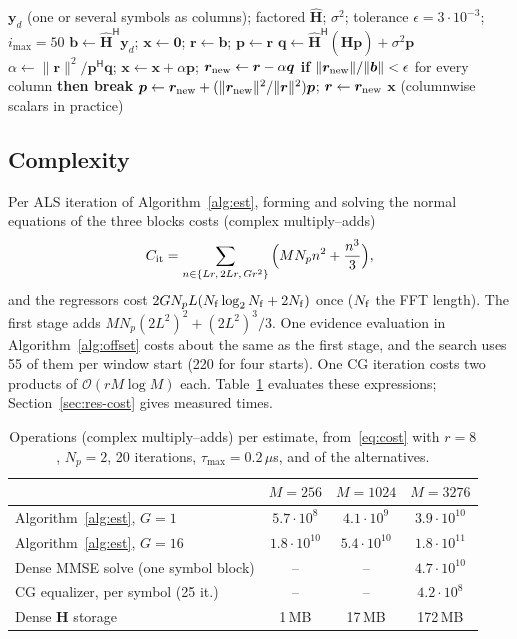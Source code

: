 \begin{algorithm}[!htbp]
\caption{Matrix-free CG-MMSE equalization}\label{alg:cg}
\begin{algorithmic}[1]
\Require $\bm y_d$ (one or several symbols as columns); factored $\hat{\bm H}$; $\sigma^2$; tolerance $\epsilon=3\cdot10^{-3}$; $i_{\max}=50$
\State $\bm b\gets\hat{\bm H}^{\mathsf H}\bm y_d$; $\bm x\gets\bm 0$; $\bm r\gets\bm b$; $\bm p\gets\bm r$
  \State $\bm q\gets\hat{\bm H}^{\mathsf H}(\hat{\bm H}\bm p)+\sigma^2\bm p$ 
  \State $\alpha\gets\|\bm r\|^2/\bm p^{\mathsf H}\bm q$; $\bm x\gets\bm x+\alpha\bm p$; $\bm r_{\rm new}\gets\bm r-\alpha\bm q$
  \State \textbf{if} $\|\bm r_{\rm new}\|/\|\bm b\|<\epsilon$ for every column \textbf{then break}
  \State $\bm p\gets\bm r_{\rm new}+(\|\bm r_{\rm new}\|^2/\|\bm r\|^2)\bm p$; $\bm r\gets\bm r_{\rm new}$
\EndFor
\State \Return $\bm x$ (columnwise scalars in practice)
\end{algorithmic}
\end{algorithm}

\subsection{Complexity}\label{sec:complexity}
Per ALS iteration of Algorithm~\ref{alg:est}, forming and solving the normal equations of the
three blocks costs (complex multiply--adds)
\begin{equation}
C_{\rm it}=\sum_{n\in\{Lr,\,2Lr,\,Gr^2\}}\Big(MN_pn^2+\frac{n^3}{3}\Big),
\label{eq:cost}
\end{equation}
and the regressors cost $2GN_pL(N_{\rm f}\log_2N_{\rm f}+2N_{\rm f})$ once ($N_{\rm f}$ the FFT length).
The first stage adds $MN_p(2L^2)^2+(2L^2)^3/3$. One evidence evaluation in Algorithm~\ref{alg:offset}
costs about the same as the first stage, and the search uses 55 of them per window start (220 for four starts). One CG iteration costs
two products of $\mathcal O(rM\log M)$ each. Table~\ref{tab:cost} evaluates these expressions;
Section~\ref{sec:res-cost} gives measured times.

\begin{table}[!htbp]\centering
\caption{Operations (complex multiply--adds) per estimate, from~\eqref{eq:cost} with $r=8$, $N_p=2$, 20 iterations, $\tau_{\max}=0.2\,\mu$s, and of the alternatives.}
\label{tab:cost}
\begin{tabular}{lccc}\toprule
 & $M=256$ & $M=1024$ & $M=3276$ \\\midrule
Algorithm~\ref{alg:est}, $G=1$ & $5.7\cdot10^{8}$ & $4.1\cdot10^{9}$ & $3.9\cdot10^{10}$ \\
Algorithm~\ref{alg:est}, $G=16$ & $1.8\cdot10^{10}$ & $5.4\cdot10^{10}$ & $1.8\cdot10^{11}$ \\
Dense MMSE solve (one symbol block) & -- & -- & $4.7\cdot10^{10}$ \\
CG equalizer, per symbol (25 it.) & -- & -- & $4.2\cdot10^{8}$ \\
Dense $\bm H$ storage & 1\,MB & 17\,MB & 172\,MB \\\bottomrule
\end{tabular}
\end{table}
